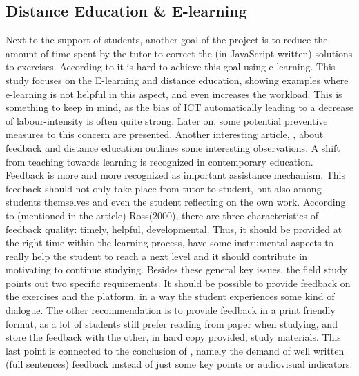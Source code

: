 \documentclass{article}
\begin{document}
\subsection{Distance Education \& E-learning}

Next to the support of students, another goal of the project is to reduce the 
amount of time spent by the tutor to correct the (in JavaScript written) 
solutions to exercises. According to
\citep{guri2005distance}
it is hard to achieve this goal using 
e-learning. This study focuses on the E-learning and distance education, 
showing
examples where e-learning is not helpful in this aspect, and even 
increases the workload. This is something to keep in mind, as the bias of 
ICT automatically leading to a decrease of labour-intensity is often quite 
strong. Later on, some potential preventive measures to this concern
are presented. \newline Another interesting article, 
\citep{ypsilandis2002feedback}
, about feedback and distance education 
outlines some interesting observations. A shift from teaching towards learning
is recognized in contemporary education. Feedback is more and more 
recognized as important assistance mechanism. This feedback should not only
take place from tutor to student, but also among students themselves and even
the student reflecting on the own work. According to (mentioned in the
article) Ross(2000), there are three characteristics of feedback quality:
timely, helpful, developmental. Thus, it
should be provided at the right time within the learning process, have some 
instrumental aspects to really help the student to reach a next level and it 
should contribute in motivating to continue studying. Besides these general 
key issues, the field study points out two specific requirements. It should be
possible to provide feedback on the exercises and the platform, in a way the
student experiences some kind of dialogue. The other
recommendation is to provide feedback in a print friendly format, as a lot of 
students still prefer reading from paper when studying, and store
the feedback with the other,
in hard copy provided, study materials. This last point is connected to the conclusion 
of \citep{shepherdgraduate}, namely the demand of well written
(full sentences) 
feedback instead of just some key points or audiovisual indicators.
\end{document}
